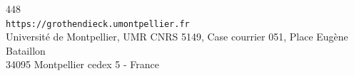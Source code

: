 
\begin{center}
{\small
448\\
\texttt{https://grothendieck.umontpellier.fr}\\
Université de Montpellier, UMR CNRS 5149, Case courrier 051, Place Eugène Bataillon\\
34095 Montpellier cedex 5 - France
}
\end{center}